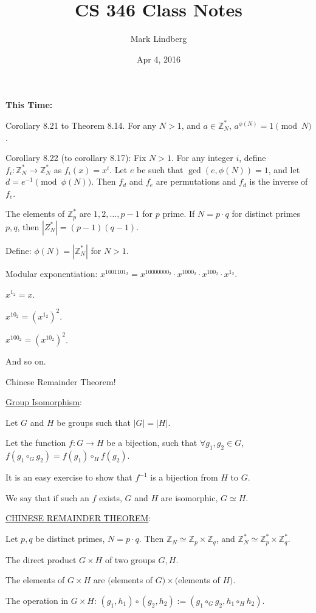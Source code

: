 \documentclass[12pt]{article}
\newcommand{\Z}{\mathbb{Z}}
\begin{document}
\title{CS 346 Class Notes}
\date{Apr 4, 2016}
\author{Mark Lindberg}
\maketitle
\thispagestyle{fancy}

{\bf This Time:}

Corollary 8.21 to Theorem 8.14. For any $N>1$, and $a\in\Z_N^*$, $a^{\phi(N)}=1\pmod{N}$.

Corollary 8.22 (to corollary 8.17): Fix $N>1$. For any integer $i$, define $f_i:\Z_N^*\to\Z_N^*$ as $f_i(x)=x^i$. Let $e$ be such that $\gcd(e,\phi(N))=1$, and let $d=e^{-1}\pmod{\phi(N)}$. Then $f_d$ and $f_e$ are permutations and $f_d$ is the inverse of $f_e$.

The elements of $\Z_p^*$ are $1,2,\dots,p-1$ for $p$ prime. If $N=p\cdot q$ for distinct primes $p,q$, then $|Z_N^*|=(p-1)(q-1)$.

Define: $\phi(N)=|\Z_N^*|$ for $N>1$.

Modular exponentiation: $x^{1001101_2}=x^{10000000_2}\cdot x^{1000_2}\cdot x^{100_2}\cdot x^{1_2}$.

$x^{1_2}=x$.

$x^{10_2}=(x^{1_2})^2$.

$x^{100_2}=(x^{10_2})^2$.

And so on.

Chinese Remainder Theorem!

\underline{Group Isomorphism}:

Let $G$ and $H$ be groups such that $|G|=|H|$.

Let the function $f:G\to H$ be a bijection, such that $\forall g_1,g_2\in G$, $f(g_1\circ_Gg_2)=f(g_1)\circ_Hf(g_2)$.

It is an easy exercise to show that $f^{-1}$ is a bijection from $H$ to $G$.

We say that if such an $f$ exists, $G$ and $H$ are isomorphic, $G\simeq H$.

\underline{CHINESE REMAINDER THEOREM}:

Let $p,q$ be distinct primes, $N=p\cdot q$. Then $\Z_N\simeq \Z_p\times \Z_q$, and $\Z_N^*\simeq \Z_p^*\times\Z_q^*$.

The direct product $G\times H$ of two groups $G,H$.

The elements of $G\times H$ are $($elements of $G)\times($elements of $H)$.

The operation in $G\times H$: $(g_1,h_1)\circ(g_2,h_2):=(g_1\circ_Gg_2,h_1\circ_Hh_2)$.
\end{document}
